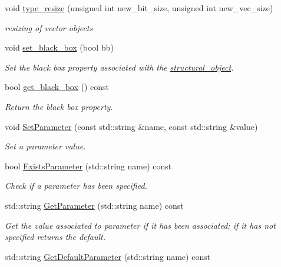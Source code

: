 \begin{DoxyCompactItemize}
void \hyperlink{classstructural__object_ad14f4fa94f96ad1e6709027ef7001f37}{type\+\_\+resize} (unsigned int new\+\_\+bit\+\_\+size, unsigned int new\+\_\+vec\+\_\+size)
\begin{DoxyCompactList}\small\item\em resizing of vector objects \end{DoxyCompactList}\item 
void \hyperlink{classstructural__object_a20aae199c4cd2f5d9877f753bb1426f8}{set\+\_\+black\+\_\+box} (bool bb)
\begin{DoxyCompactList}\small\item\em Set the black box property associated with the \hyperlink{classstructural__object}{structural\+\_\+object}. \end{DoxyCompactList}\item 
bool \hyperlink{classstructural__object_ad191c9ede27d8f1aab98cbf72343ba03}{get\+\_\+black\+\_\+box} () const
\begin{DoxyCompactList}\small\item\em Return the black box property. \end{DoxyCompactList}\item 
void \hyperlink{classstructural__object_a169dc4335ea6a4d40283315b8c30a3a9}{Set\+Parameter} (const std\+::string \&name, const std\+::string \&value)
\begin{DoxyCompactList}\small\item\em Set a parameter value. \end{DoxyCompactList}\item 
bool \hyperlink{classstructural__object_a8576345629efc406382a716de612d276}{Exists\+Parameter} (std\+::string name) const
\begin{DoxyCompactList}\small\item\em Check if a parameter has been specified. \end{DoxyCompactList}\item 
std\+::string \hyperlink{classstructural__object_a34b15e206f9c2911854a5fc785de001d}{Get\+Parameter} (std\+::string name) const
\begin{DoxyCompactList}\small\item\em Get the value associated to parameter if it has been associated; if it has not specified returns the default. \end{DoxyCompactList}\item 
std\+::string \hyperlink{classstructural__object_a7e02b1926026f213fa75e099bef0f6e0}{Get\+Default\+Parameter} (std\+::string name) const

\end{DoxyCompactItemize}
